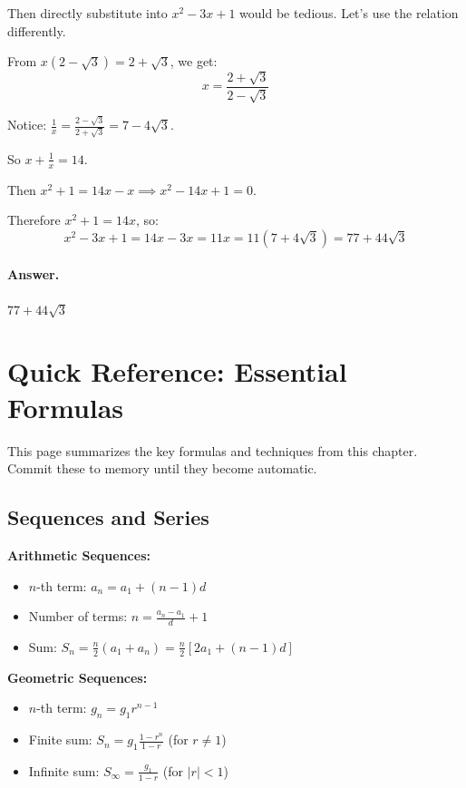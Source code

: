 \documentclass[12pt]{extarticle}
\begin{document}
Then directly substitute into $x^2-3x+1$ would be tedious. Let's use the relation differently.

From $x(2-\sqrt{3}) = 2+\sqrt{3}$, we get:
\[
x = \frac{2+\sqrt{3}}{2-\sqrt{3}}
\]

Notice: $\frac{1}{x} = \frac{2-\sqrt{3}}{2+\sqrt{3}} = 7-4\sqrt{3}$.

So $x + \frac{1}{x} = 14$.

Then $x^2 + 1 = 14x - x \implies x^2 - 14x + 1 = 0$.

Therefore $x^2 + 1 = 14x$, so:
\[
x^2 - 3x + 1 = 14x - 3x = 11x = 11(7+4\sqrt{3}) = 77 + 44\sqrt{3}
\]

\paragraph{Answer.} $\boxed{77+44\sqrt{3}}$

\newpage

\section*{Quick Reference: Essential Formulas}

This page summarizes the key formulas and techniques from this chapter. Commit these to memory until they become automatic.

\subsection*{Sequences and Series}

\textbf{Arithmetic Sequences:}
\begin{itemize}
    \item $n$-th term: $a_n = a_1 + (n-1)d$
    \item Number of terms: $n = \frac{a_n - a_1}{d} + 1$
    \item Sum: $S_n = \frac{n}{2}(a_1 + a_n) = \frac{n}{2}[2a_1 + (n-1)d]$
\end{itemize}

\textbf{Geometric Sequences:}
\begin{itemize}
    \item $n$-th term: $g_n = g_1 r^{n-1}$
    \item Finite sum: $S_n = g_1 \frac{1-r^n}{1-r}$ (for $r \neq 1$)
    \item Infinite sum: $S_\infty = \frac{g_1}{1-r}$ (for $|r| < 1$)
\end{itemize}
\end{document}
